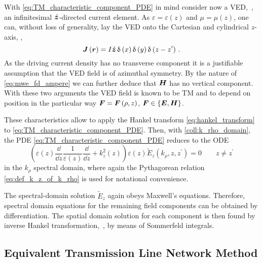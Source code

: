 With \eqref{eq:TM_characteristic_component_PDE} in mind consider now 
a \ac{VED},~\ie, an infinitesimal $\uv{z}$-directed current element.
As $\varepsilon = \varepsilon\left(z\right)$ and $\mu = \mu\left(z\right)$,
one can, without loss of generality, lay the \ac{VED} onto the Cartesian
and cylindrical $z$-axis, \ie,
\begin{equation}\label{eq:VED_current_density}
	\pvec{J} \left(\pvec{r}\right) =
	I \uv{z}
	\diracDelta\left(x\right)
	\diracDelta\left(y\right)
	\diracDelta\left(z - z^\prime\right)
	\, .
\end{equation}
As the driving current density has no transverse component it is a justifiable
assumption that the \ac{VED} field is of azimuthal symmetry.
By the nature of \eqref{eq:mwe_fd_ampere} we can further deduce that $\pvec{H}$
has no vertical component.
With these two arguments the \ac{VED} field is known to be \ac{TM} and to depend
on position in the particular way
$\pvec{F} = \pvec{F} \left(\rho, z\right)$,
$\pvec{F} \in \left\{\pvec{E}, \pvec{H}\right\}$.

These characteristics allow to apply the Hankel transform
\eqref{eq:hankel_transform} to \eqref{eq:TM_characteristic_component_PDE}.
Then, with \cref{coll:k_rho_domain}, the \ac{PDE}
\eqref{eq:TM_characteristic_component_PDE} reduces to the \ac{ODE}
\begin{equation}\label{eq:VED_E_z_ODE}
	\left(
		\varepsilon \left(z\right)
		\frac{\dd}{\dd z}
		\frac{1}{\varepsilon \left(z\right)}
		\frac{\dd}{\dd z}
		+
		k_z^2 \left(z\right)
	\right)
	\varepsilon \left(z\right)
	\tilde{E}_z \left(k_\rho, z, z^\prime\right) = 0
	\qquad
	z \neq z^\prime
\end{equation}
in the $k_\rho$ spectral domain, where again the Pythagorean relation
\eqref{eq:def_k_z_of_k_rho} is used for notational convenience.

The spectral-domain solution $\tilde{E}_z$ again obeys Maxwell's equations.
Therefore, spectral domain equations for the remaining field components can be
obtained by differentiation.
The spatial domain solution for each component is then found by inverse Hankel
transformation,~\ie, by means of Sommerfeld integrals.






\subsection{Equivalent Transmission Line Network Method}
\label{subsec:network_method}

